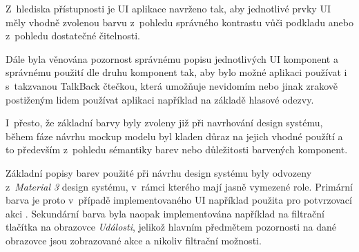 \begin{minipage}[t]{0.45\textwidth}

\bigskip
{}
Z~hlediska přístupnosti je UI aplikace navrženo tak, aby jednotlivé prvky UI měly vhodně zvolenou barvu z~pohledu
správného kontrastu vůči podkladu anebo z~pohledu dostatečné čitelnosti.

Dále byla věnována pozornost správnému popisu jednotlivých UI komponent a správnému použití dle druhu komponent tak, aby bylo možné aplikaci používat i
s~takzvanou TalkBack čtečkou, která umožňuje nevidomím nebo jinak zrakově postiženým lidem používat aplikaci například na základě hlasové odezvy.

\bigskip
{}
I~přesto, že základní barvy byly zvoleny již při navrhování design systému, během fáze návrhu mockup modelu byl kladen důraz na jejich 
vhodné použítí a to především z~pohledu sémantiky barev nebo důležitosti barvených komponent.


Základní popisy barev použité při návrhu design systému byly odvozeny z~\textit{Material 3} design systému, v~rámci kterého mají jasně 
vymezené role. \cite{m3ColorRoles}
Primární barva je proto v~případě implementovaného UI například použita pro potvrzovací akci . 
Sekundární barva byla naopak
implementována například na filtrační tlačítka na obrazovce \textit{Události}, jelikož hlavním předmětem pozornosti na dané obrazovce 
jsou zobrazované akce a nikoliv filtrační možnosti.

\bigskip



\end{minipage}
\hfill
